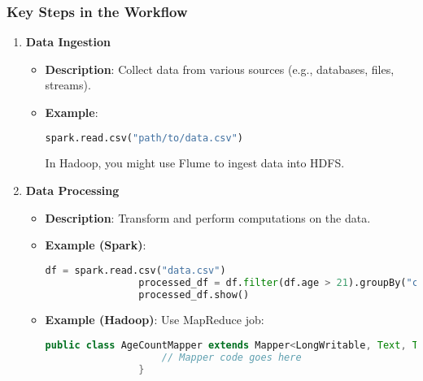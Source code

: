 \documentclass[aspectratio=169]{beamer}
\begin{document}
\begin{frame}[fragile]
    \frametitle{Key Steps in the Workflow}
    \begin{enumerate}
        \item \textbf{Data Ingestion}
            \begin{itemize}
                \item \textbf{Description}: Collect data from various sources (e.g., databases, files, streams).
                \item \textbf{Example}: 
                \begin{lstlisting}[language=Python]
                spark.read.csv("path/to/data.csv")
                \end{lstlisting}
                In Hadoop, you might use Flume to ingest data into HDFS.
            \end{itemize}

        \item \textbf{Data Processing}
            \begin{itemize}
                \item \textbf{Description}: Transform and perform computations on the data.
                \item \textbf{Example (Spark)}:
                \begin{lstlisting}[language=Python]
                df = spark.read.csv("data.csv")
                processed_df = df.filter(df.age > 21).groupBy("country").count()
                processed_df.show()
                \end{lstlisting}
                \item \textbf{Example (Hadoop)}: Use MapReduce job:
                \begin{lstlisting}[language=Java]
                public class AgeCountMapper extends Mapper<LongWritable, Text, Text, IntWritable> {
                    // Mapper code goes here
                }
                \end{lstlisting}
            \end{itemize}
    \end{enumerate}
\end{frame}
\end{document}
